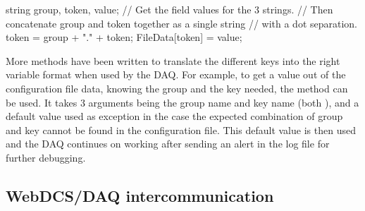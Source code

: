 	\begin{cppcode}
 string group, token, value;
 // Get the field values for the 3 strings.
 // Then concatenate group and token together as a single string
 // with a dot separation.
 token = group + "." + token;
 FileData[token] = value;
	\end{cppcode}
	\vspace{5mm}
	
	More methods have been written to translate the different keys into the right variable format when used by the DAQ. For example, to get a  value out of the configuration file data, knowing the group and the key needed, the method  can be used. It takes 3 arguments being the group name and key name (both ), and a default  value used as exception in the case the expected combination of group and key cannot be found in the configuration file. This default value is then used and the DAQ continues on working after sending an alert in the log file for further debugging.\\

    \subsection{WebDCS/DAQ intercommunication}
    \label{app1:ssec:dcsdaqcomm}
    
